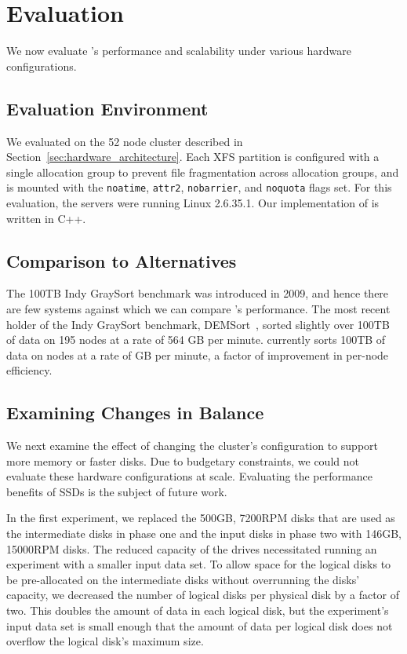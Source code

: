 \section{Evaluation}
\label{sec:evaluation}

We now evaluate \tritonsort's performance and scalability under
various hardware configurations.

\subsection{Evaluation Environment}

We evaluated \tritonsort on the 52 node cluster described in
Section~\ref{sec:hardware_architecture}.  Each XFS partition is configured with
a single allocation group to prevent file fragmentation across allocation
groups, and is mounted with the \texttt{noatime}, \texttt{attr2},
\texttt{nobarrier}, and \texttt{noquota} flags set.  For this evaluation, the
servers were running Linux 2.6.35.1. Our implementation of \tritonsort is
written in C++.

\subsection{Comparison to Alternatives}

The 100TB Indy GraySort benchmark was introduced in 2009, and hence there are
few systems against which we can compare \tritonsort's performance. The most
recent holder of the Indy GraySort benchmark, DEMSort~\cite{DEMSort}, sorted
slightly over 100TB of data on 195 nodes at a rate of 564 GB per minute.
\tritonsort currently sorts 100TB of data on \tsnodes nodes at a rate of
\tsrate GB per minute, a factor of \tsimprovementfactor improvement in per-node
efficiency.

\subsection{Examining Changes in Balance}

We next examine the effect of changing the cluster's configuration to support
more memory or faster disks. Due to budgetary constraints, we could not
evaluate these hardware configurations at scale. Evaluating
the performance benefits of SSDs is the subject of future work.

In the first experiment, we replaced the 500GB, 7200RPM disks that are used as
the intermediate disks in phase one and the input disks in phase two with
146GB, 15000RPM disks. The reduced capacity of the drives necessitated running
an experiment with a smaller input data set.  To allow space for the logical
disks to be pre-allocated on the intermediate disks without overrunning the
disks' capacity, we decreased the number of logical disks per physical disk by
a factor of two. This doubles the amount of data in each logical disk, but the
experiment's input data set is small enough that the amount of data per logical
disk does not overflow the logical disk's maximum size.

